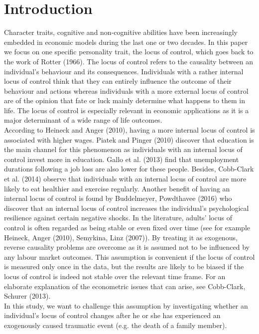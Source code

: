 \documentclass[12pt,a4paper,fleqn]{article}
\begin{document}
\section{Introduction}
Character traits, cognitive and non-cognitive abilities have been increasingly embedded in economic models during the last one or two decades. In this paper we focus on one specific personality trait, the locus of control, which goes back to the work of Rotter (1966). The locus of control refers to the causality between an individual's behaviour and its consequences. Individuals with a rather internal locus of control think that they can entirely influence the outcome of their behaviour and actions whereas individuals with a more external locus of control are of the opinion that fate or luck mainly determine what happens to them in life.
The locus of control is especially relevant in economic applications as it is a major determinant of a wide range of life outcomes. \\
According to Heineck and Anger (2010), having a more internal locus of control is associated with higher wages. Piatek and Pinger (2010) discover that education is the main channel for this phenomenon as individuals with an internal locus of control invest more in education. Gallo et al. (2013) find that unemployment durations following a job loss are also lower for these people. Besides, Cobb-Clark et al. (2014) observe that individuals with an internal locus of control are more likely to eat healthier and exercise regularly. Another benefit of having an internal locus of control is found by Buddelmeyer, Powdthavee (2016) who discover that an internal locus of control increases the individual's psychological resilience against certain negative shocks. 
In the literature, adults' locus of control is often regarded as being stable or even fixed over time (see for example Heineck, Anger (2010), Semykina, Linz (2007)). By treating it as exogenous, reverse causality problems are overcome as it is assumed not to be influenced by any labour market outcomes. This assumption is convenient if the locus of control is measured only once in the data, but the results are likely to be biased if the locus of control is indeed not stable over the relevant time frame. For an elaborate explanation of the econometric issues that can arise, see Cobb-Clark, Schurer (2013). \\
In this study, we want to challenge this assumption by investigating whether an individual's locus of control changes after he or she has experienced an exogenously caused traumatic event (e.g. the death of a family member). \\
\end{document}

